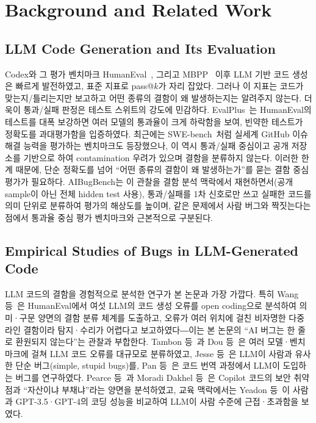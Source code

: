 \documentclass[10pt,conference]{IEEEtran}
\begin{document}
\section{Background and Related Work}
\subsection{LLM Code Generation and Its Evaluation}
Codex와 그 평가 벤치마크 HumanEval~\cite{chen2021codex}, 그리고 MBPP~\cite{austin2021mbpp} 이후 LLM 기반 코드 생성은 빠르게 발전하였고, 표준 지표로 pass@$k$가 자리 잡았다. 그러나 이 지표는 코드가 맞는지/틀리는지만 보고하고 어떤 종류의 결함이 왜 발생하는지는 알려주지 않는다. 더욱이 통과/실패 판정은 테스트 스위트의 강도에 민감하다. EvalPlus~\cite{liu2023evalplus}는 HumanEval의 테스트를 대폭 보강하면 여러 모델의 통과율이 크게 하락함을 보여, 빈약한 테스트가 정확도를 과대평가함을 입증하였다. 최근에는 SWE-bench~\cite{jimenez2024swebench}처럼 실세계 GitHub 이슈 해결 능력을 평가하는 벤치마크도 등장했으나, 이 역시 통과/실패 중심이고 공개 저장소를 기반으로 하여 contamination 우려가 있으며 결함을 분류하지 않는다. 이러한 한계 때문에, 단순 정확도를 넘어 ``어떤 종류의 결함이 왜 발생하는가''를 묻는 결함 중심 평가가 필요하다. AIBugBench는 이 관찰을 결함 분석 맥락에서 재현하면서(공개 sample이 아닌 전체 hidden test 사용), 통과/실패를 1차 신호로만 쓰고 실패한 코드를 의미 단위로 분류하여 평가의 해상도를 높이며, 같은 문제에서 사람 버그와 짝짓는다는 점에서 통과율 중심 평가 벤치마크와 근본적으로 구분된다.

\subsection{Empirical Studies of Bugs in LLM-Generated Code}
LLM 코드의 결함을 경험적으로 분석한 연구가 본 논문과 가장 가깝다. 특히 Wang 등~\cite{wang2025characteristics}은 HumanEval에서 여섯 LLM의 코드 생성 오류를 open coding으로 분석하여 의미·구문 양면의 결함 분류 체계를 도출하고, 오류가 여러 위치에 걸친 비자명한 다중 라인 결함이라 탐지·수리가 어렵다고 보고하였다―이는 본 논문의 ``AI 버그는 한 줄로 환원되지 않는다''는 관찰과 부합한다. Tambon 등~\cite{tambon2025bugs}과 Dou 등~\cite{dou2026wrong}은 여러 모델·벤치마크에 걸쳐 LLM 코드 오류를 대규모로 분류하였고, Jesse 등~\cite{jesse2023bugs}은 LLM이 사람과 유사한 단순 버그(simple, stupid bugs)를, Pan 등~\cite{pan2024lost}은 코드 번역 과정에서 LLM이 도입하는 버그를 연구하였다. Pearce 등~\cite{pearce2022asleep}과 Moradi Dakhel 등~\cite{dakhel2023github}은 Copilot 코드의 보안 취약점과 ``자산이냐 부채냐''라는 양면을 분석하였고, 교육 맥락에서는 Yeadon 등~\cite{yeadon2024comparison}이 사람과 GPT-3.5·GPT-4의 코딩 성능을 비교하여 LLM이 사람 수준에 근접·초과함을 보였다.
\end{document}

